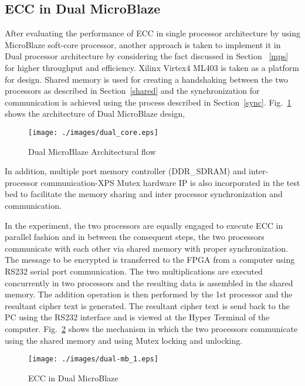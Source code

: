 \documentclass[preprint,12pt]{elsarticle}
\begin{document}
\subsection{ ECC in Dual MicroBlaze}
After evaluating the performance of ECC in single processor architecture by using MicroBlaze  soft-core processor, another approach is taken to implement it in Dual processor architecture by considering the fact discussed in Section ~\ref{mps} for higher throughput and efficiency. Xilinx Virtex4 ML403 is taken as a platform for design. Shared memory is used for creating a handshaking between the two processors as described in Section~\ref{shared} and the synchronization for communication is achieved using the process described in Section~\ref{sync}. Fig.~\ref{dual} shows the architecture of Dual MicroBlaze design,
\begin{figure}[htbp]
\centering
\texttt{[image: ./images/dual\_core.eps]}
\caption{Dual MicroBlaze Architectural flow}
\label{dual}
\vspace{-12pt}
\end{figure}

In addition, multiple port memory controller (DDR\_SDRAM) and inter-processor communication-XPS Mutex hardware IP
\cite{dual} is also incorporated in the test bed to facilitate the memory sharing and inter processor synchronization and communication.
\par In the experiment, the two processors are equally engaged to execute ECC in parallel fashion and in between the consequent steps, the two processors communicate with each other via shared memory with proper synchronization. The message to be encrypted is transferred to the FPGA from a computer using RS232 serial port communication. The two multiplications are executed concurrently in two processors and the resulting data is assembled in the shared memory. The addition operation is then performed by the 1st processor and the resultant cipher text is generated. The resultant cipher text is send back to the PC using the RS232 interface and is viewed at the Hyper Terminal of the computer. Fig.~\ref{dual-mb} shows the mechanism in which the two processors communicate using the shared memory and using Mutex locking and unlocking.\begin{figure}[htbp]
\vspace{-10pt}
\centering
\texttt{[image: ./images/dual-mb\_1.eps]}
\caption{ECC in Dual MicroBlaze}
\label{dual-mb}
\vspace{-20pt}
\end{figure}
\end{document}
